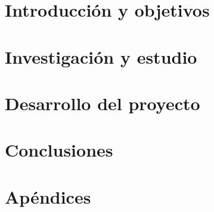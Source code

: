 
\cleardoubleevenemptypage
\part{Introducción y objetivos}
\label{part:introduccion-objetivos}






\cleardoubleevenemptypage
\part{Investigación y estudio}
\label{part:investigacion-estudio}



\cleardoubleevenemptypage
\part{Desarrollo del proyecto}
\label{part:desarrollo-proyecto}



\cleardoubleevenemptypage
\part{Conclusiones}
\label{part:conclusiones}



\cleardoubleevenemptypage
\part{Apéndices}
\label{part:apendices}
\appendix


